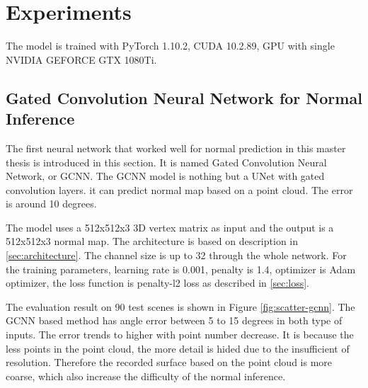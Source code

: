 
\chapter{Experiments} %

\label{ch:05} %


The model is trained with PyTorch 1.10.2, CUDA 10.2.89, GPU with single NVIDIA GEFORCE GTX 1080Ti.


\section{Gated Convolution Neural Network for Normal Inference}

The first neural network that worked well for normal prediction in this master thesis is introduced in this section. It is named Gated Convolution Neural Network, or GCNN. The GCNN model is nothing but a UNet with gated convolution layers. it can predict normal map based on a point cloud. The error is around 10 degrees.

The model uses a 512x512x3 3D vertex matrix as input and the output is a 512x512x3 normal map. The architecture is based on description in \ref{sec:architecture}. The channel size is up to 32 through the whole network. For the training parameters, learning rate is 0.001, penalty is 1.4, optimizer is Adam optimizer, the loss function is penalty-l2 loss as described in \ref{sec:loss}.




The evaluation result on 90 test scenes is shown in Figure \ref{fig:scatter-gcnn}.
The GCNN based method has angle error between 5 to 15 degrees in both type of inputs. The error trends to higher with point number decrease. It is because the less points in the point cloud, the more detail is hided due to the insufficient of resolution. Therefore the recorded surface based on the point cloud is more coarse, which also increase the difficulty of the normal inference.

